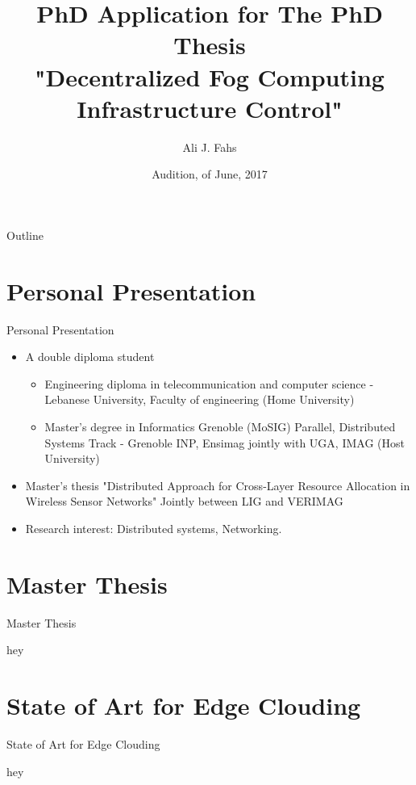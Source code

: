 \documentclass{beamer}
\title{PhD Application for The PhD Thesis\\ "Decentralized Fog Computing Infrastructure Control"}
\subtitle{}
\author{Ali J. Fahs}%
\institute[Institut de Recherche en Informatique et Systèmes Aléatoires (IRISA)] %
{
  
  Institut de Recherche en Informatique et Systèmes Aléatoires (IRISA)\\MYRIADS Team\\Supervised by Professor Guillaume Pierre 
  
  
  }
\date{Audition, \nth{8} of June, 2017}
\begin{document}
\begin{frame}
  \titlepage
\end{frame}

\begin{frame}{Outline}
  \tableofcontents
 
\end{frame}
\section{Personal Presentation}
\begin{frame}{Personal Presentation}
\begin{itemize}
\item A double diploma student  
\begin{itemize}
\item Engineering diploma in telecommunication and computer science - Lebanese University, Faculty of engineering (Home University)
\item Master's degree in Informatics Grenoble (MoSIG) Parallel, Distributed Systems Track - Grenoble INP, Ensimag jointly with UGA, IMAG (Host University)
\end{itemize}
\item Master's thesis "Distributed Approach for Cross-Layer Resource Allocation in Wireless Sensor Networks" Jointly between LIG and VERIMAG
\item Research interest: Distributed systems, Networking.
\end{itemize}

 
\end{frame}
\section{Master Thesis}

\begin{frame}{Master Thesis}

hey
 
\end{frame}

\section{State of Art for Edge Clouding}

\begin{frame}{State of Art for Edge Clouding}

hey
 
\end{frame}
\end{document}
